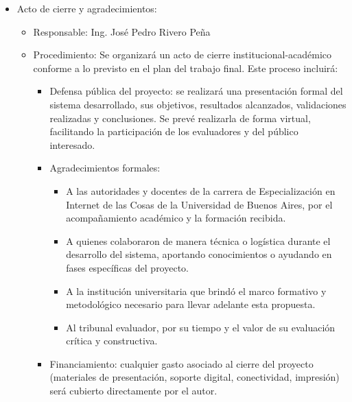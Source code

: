 \documentclass[
11pt, %
]{charter}
\begin{document}
\begin{itemize}
	\item Acto de cierre y agradecimientos:
	      \begin{itemize}
		      \item Responsable: Ing. José Pedro Rivero Peña
		      \item Procedimiento: Se organizará un acto de cierre institucional-académico conforme a lo previsto en el plan del trabajo final. Este proceso incluirá:
		            \begin{itemize}
			            \item Defensa pública del proyecto: se realizará una presentación formal del sistema desarrollado, sus objetivos, resultados alcanzados, validaciones realizadas y conclusiones. Se prevé realizarla de forma virtual, facilitando la participación de los evaluadores y del público interesado.
			            \item Agradecimientos formales:
			                  \begin{itemize}
				                  \item A las autoridades y docentes de la carrera de Especialización en Internet de las Cosas de la Universidad de Buenos Aires, por el acompañamiento académico y la formación recibida.
				                  \item A quienes colaboraron de manera técnica o logística durante el desarrollo del sistema, aportando conocimientos o ayudando en fases específicas del proyecto.
				                  \item A la institución universitaria que brindó el marco formativo y metodológico necesario para llevar adelante esta propuesta.
				                  \item Al tribunal evaluador, por su tiempo y el valor de su evaluación crítica y constructiva.
			                  \end{itemize}
			            \item Financiamiento: cualquier gasto asociado al cierre del proyecto (materiales de presentación, soporte digital, conectividad, impresión) será cubierto directamente por el autor.
		            \end{itemize}
	      \end{itemize}
\end{itemize}
\end{document}
